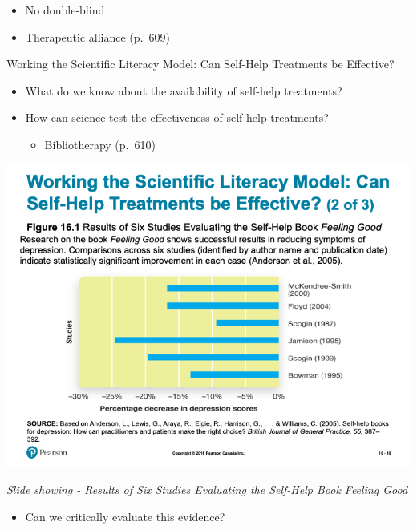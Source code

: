 \documentclass[
]{book}
\providecommand{\tightlist}{%
  \setlength{\itemsep}{0pt}\setlength{\parskip}{0pt}}
\begin{document}
\begin{reflect}
\begin{itemize}
\begin{itemize}
    \begin{itemize}
    \tightlist
    \item
      No double-blind\\
    \item
      Therapeutic alliance (p.~609)
    \end{itemize}
  \end{itemize}
\end{itemize}

Working the Scientific Literacy Model: Can Self-Help Treatments be Effective?

\begin{itemize}
\tightlist
\item
  What do we know about the availability of self-help treatments?\\
\item
  How can science test the effectiveness of self-help treatments?

  \begin{itemize}
  \tightlist
  \item
    Bibliotherapy (p.~610)
  \end{itemize}
\end{itemize}

\includegraphics{assets/unit_11/slide_18.png}

\emph{Slide showing - Results of Six Studies Evaluating the Self-Help Book Feeling Good}

\begin{itemize}
\tightlist
\item
  Can we critically evaluate this evidence?


\end{itemize}
\end{reflect}
\end{document}
